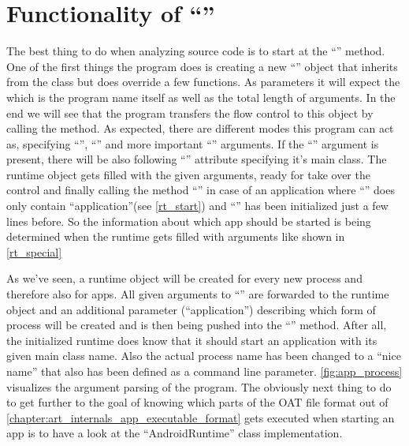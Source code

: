 \section{Functionality of ``''}
\label{section:app_main}
The best thing to do when analyzing source code is to start at the
``'' method. One of the first things the program does is
creating a new ``'' object that inherits from the
 class but does override a few functions. As parameters it will expect the 
which is the program name itself as well as the total length of arguments.
In the end we will see that the program transfers the flow control to this object by calling the  method. As expected, there
are different modes this program can act as, specifying ``'',
``'' and more important ``'' arguments.
If the ``'' argument is present, there will be also following ``'' attribute specifying it's main class.
The runtime object gets filled with the given arguments, ready for take
over the control and finally calling the method ``'' in case of an application
where ``'' does only contain ``application''(see \autoref{rt_start}) and ``'' has been initialized just a few lines before. So the information about which app should be started is being determined
when the runtime gets filled with arguments like shown in \autoref{rt_special}





As we've seen, a runtime object will be created for every new process and
therefore also for apps. All given arguments to ``''
are forwarded to the runtime object and an additional parameter (``application'') describing which form of process will be created and is then being pushed
into the ``'' method.
After all, the initialized runtime does know that it should start an application with its given main class name. Also the actual process name
has been changed to a ``nice name'' that also has been defined as a command
line parameter. \autoref{fig:app_process} visualizes the argument parsing
of the program.
The obviously next thing to do to get further to the goal of knowing which parts of the OAT file format out of \autoref{chapter:art_internals_app_executable_format} gets executed when starting an app is to have a look at the ``AndroidRuntime'' class implementation.

